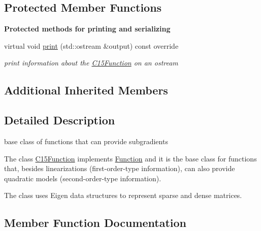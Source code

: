 \subsection*{Protected Member Functions}
\begin{Indent}\textbf{ Protected methods for printing and serializing}\par
\begin{DoxyCompactItemize}
\item 
virtual void \mbox{\hyperlink{class_s_m_spp__di__unipi__it_1_1_c15_function_a59a9fcbf8f9f86d348344b2073644b0e}{print}} (std\+::ostream \&output) const override
\begin{DoxyCompactList}\small\item\em print information about the \mbox{\hyperlink{class_s_m_spp__di__unipi__it_1_1_c15_function}{C15\+Function}} on an ostream \end{DoxyCompactList}\end{DoxyCompactItemize}
\end{Indent}
\subsection*{Additional Inherited Members}


\subsection{Detailed Description}
base class of functions that can provide subgradients 

The class \mbox{\hyperlink{class_s_m_spp__di__unipi__it_1_1_c15_function}{C15\+Function}} implements \mbox{\hyperlink{class_s_m_spp__di__unipi__it_1_1_function}{Function}} and it is the base class for functions that, besides linearizations (first-\/order-\/type information), can also provide quadratic models (second-\/order-\/type information).

The class uses Eigen data structures to represent sparse and dense matrices. 

\subsection{Member Function Documentation}
\mbox{\label{class_s_m_spp__di__unipi__it_1_1_c15_function_a50c8f5b1802c658a795d266ba66e3c29}} 
